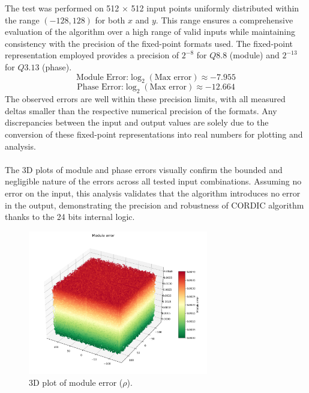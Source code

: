 The test was performed on 512 × 512 input points uniformly distributed within the range \( (-128, 128) \) for both \( x \) and \( y \).
This range ensures a comprehensive evaluation of the algorithm over a high range of valid inputs while maintaining 
consistency with the precision of the fixed-point formats used. The fixed-point representation employed provides a precision 
of \( 2^{-8} \) for \( Q8.8 \) (module) and \( 2^{-13} \) for \( Q3.13 \) (phase). 
\[
    \text{Module Error:} \log_2(\text{Max error}) \approx -7.955
\]
\[
    \text{Phase Error:} \log_2(\text{Max error}) \approx -12.664
\]
The observed errors are well within these precision limits, with all measured deltas smaller than the respective numerical precision of the formats. Any discrepancies between the input and output values are solely due to the conversion of these fixed-point representations into real numbers for plotting and analysis. 
\\\\
The 3D plots of module and phase errors visually confirm the bounded and negligible nature of the errors across 
all tested input combinations. Assuming no error on the input, this analysis validates that the algorithm introduces 
no error in the output, demonstrating the precision and robustness of CORDIC algorithm thanks to the 24 bits internal logic.

\begin{figure}[H]
    \centering
    \includegraphics[width=0.7\textwidth]{./images/Verification/module_error.png}
    \caption{3D plot of module error (\( \rho \)).}
    \label{fig:module_error}
\end{figure}

